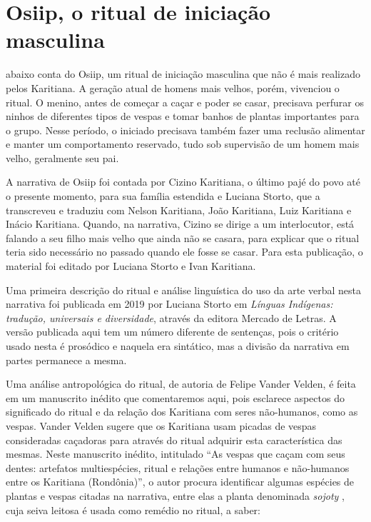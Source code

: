 \chapter{Osiip, o ritual de iniciação masculina}

 abaixo conta do Osiip, um ritual de iniciação masculina que
não é mais realizado pelos Karitiana. A geração atual de homens mais
velhos, porém, vivenciou o ritual. O menino, antes de começar a caçar e
poder se casar, precisava perfurar os ninhos de diferentes tipos de
vespas e tomar banhos de plantas importantes para o grupo. Nesse
período, o iniciado precisava também fazer uma reclusão alimentar e
manter um comportamento reservado, tudo sob supervisão de um homem mais
velho, geralmente seu pai.

A narrativa de Osiip foi contada por Cizino Karitiana, o último pajé do
povo até o presente momento, para sua família estendida e Luciana
Storto, que a transcreveu e traduziu com Nelson Karitiana, João
Karitiana, Luiz Karitiana e Inácio Karitiana. Quando, na narrativa,
Cizino se dirige a um interlocutor, está falando a seu filho mais velho
que ainda não se casara, para explicar que o ritual teria sido
necessário no passado quando ele fosse se casar. Para esta publicação, o
material foi editado por Luciana Storto e Ivan Karitiana.

Uma primeira descrição do ritual e análise linguística do uso da arte
verbal nesta narrativa foi publicada em 2019 por Luciana Storto em
\emph{Línguas Indígenas: tradução, universais e diversidade}, através da
editora Mercado de Letras. A versão publicada aqui tem um número
diferente de sentenças, pois o critério usado nesta é prosódico e
naquela era sintático, mas a divisão da narrativa em partes permanece a
mesma.

Uma análise antropológica do ritual, de autoria de Felipe Vander Velden,
é feita em um manuscrito inédito que comentaremos aqui, pois esclarece
aspectos do significado do ritual e da relação dos Karitiana com seres
não-humanos, como as vespas. Vander Velden sugere que os Karitiana usam
picadas de vespas consideradas caçadoras para através do ritual adquirir
esta característica das mesmas. Neste manuscrito inédito, intitulado
``As vespas que caçam com seus dentes: artefatos multiespécies, ritual e
relações entre humanos e não-humanos entre os Karitiana (Rondônia)'', o
autor procura identificar algumas espécies de plantas e vespas citadas
na narrativa, entre elas a planta denominada \emph{sojoty} , cuja seiva
leitosa é usada como remédio no ritual, a saber:

